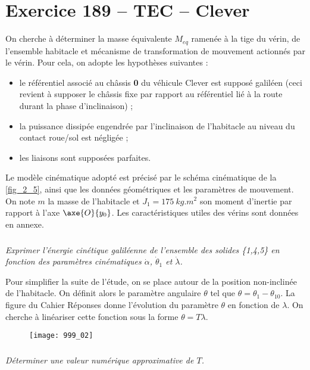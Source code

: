 \section*{Exercice 189 -- TEC -- Clever}
\setcounter{exo}{0}
On cherche à déterminer la masse équivalente $M_{eq}$ ramenée à la tige du vérin, de l'ensemble habitacle et mécanisme de transformation de mouvement actionnés par le vérin. Pour cela, on adopte les hypothèses suivantes :
\begin{itemize}
\item le référentiel associé au châssis \textbf{0} du véhicule Clever est supposé galiléen (ceci revient à supposer le châssis fixe par rapport au référentiel lié à la route durant la phase d'inclinaison) ;
\item la puissance dissipée engendrée par l'inclinaison de l'habitacle au niveau du contact roue/sol est négligée ;
\item les liaisons sont supposées parfaites.
\end{itemize}

Le modèle cinématique adopté est précisé par le schéma cinématique de la \autoref{fig_2_5}, ainsi que les données géométriques et les paramètres de mouvement. On note $m$ la masse de l'habitacle et $J_1 = \SI{175}{kg.m^{2}}$ son moment d'inertie par rapport à l'axe $\axe{O}{y_0}$. Les caractéristiques utiles des vérins sont données en annexe.

\subparagraph{}
\textit{Exprimer l'énergie cinétique galiléenne de l'ensemble des solides \{1,4,5\} en fonction des paramètres cinématiques  $\dot{\alpha}$,  $\dot{\theta}_1$ et  $\dot{\lambda}$.}
\ifprof
\begin{corrige}
\end{corrige}
\else
\fi




Pour simplifier la suite de l'étude, on se place autour de la position non-inclinée de l'habitacle. On définit alors le paramètre angulaire $\theta$ tel que $\theta = \theta_1 -\theta_{10}$. La figure du Cahier Réponses donne l'évolution du paramètre $\theta$ en fonction de $\lambda$. On cherche à linéariser cette fonction sous la forme $\theta = T\lambda$.

\begin{figure}[H]
\centering
\texttt{[image: 999\_02]}
\end{figure}

\subparagraph{}
\textit{Déterminer une valeur numérique approximative de $T$.}
\ifprof
\begin{corrige}
\end{corrige}
\else
\fi


